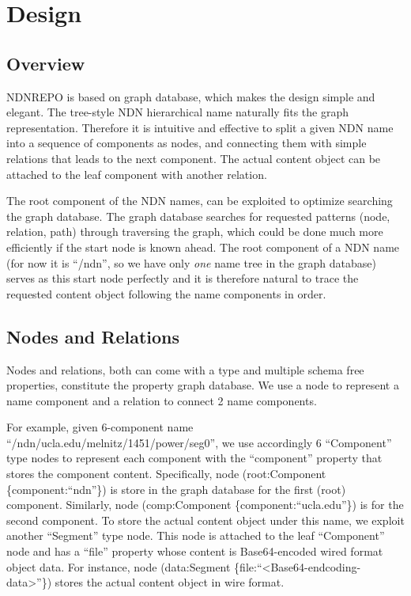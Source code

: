 \section{Design}

\subsection{Overview}

NDNREPO is based on graph database, which makes the design simple and elegant. The tree-style NDN hierarchical name naturally fits the graph representation. Therefore it is intuitive and effective to split a given NDN name into a sequence of components as nodes, and connecting them with simple relations that leads to the next component. The actual content object can be attached to the leaf component with another relation.

The root component of the NDN names, can be exploited to optimize searching the graph database. The graph database searches for requested patterns (node, relation, path) through traversing the graph, which could be done much more efficiently if the start node is known ahead. The root component of a NDN name (for now it is ``/ndn'', so we have only \emph{one} name tree in the graph database) serves as this start node perfectly and it is therefore natural to trace the requested content object following the name components in order.

\subsection{Nodes and Relations}

Nodes and relations, both can come with a type and multiple schema free properties, constitute the property graph database. We use a node to represent a name component and a relation to connect 2 name components.

For example, given 6-component name ``/ndn/ucla.edu/melnitz/1451/power/seg0'', we use accordingly 6 ``Component'' type nodes to represent each component with the ``component'' property that stores the component content. Specifically, node (root:Component \{component:``ndn''\}) is store in the graph database for the first (root) component. Similarly, node (comp:Component \{component:``ucla.edu''\}) is for the second component. To store the actual content object under this name, we exploit another ``Segment'' type node. This node is attached to the leaf ``Component'' node and has a ``file'' property whose content is Base64-encoded wired format object data. For instance, node (data:Segment \{file:``<Base64-endcoding-data>''\}) stores the actual content object in wire format.

